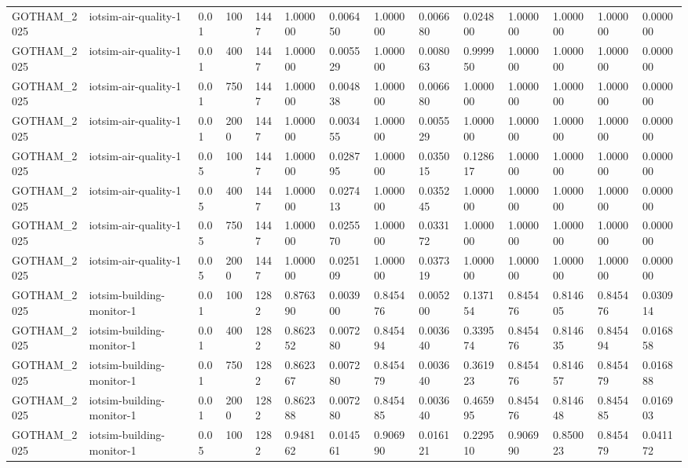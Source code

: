 \begin{tabular}{llllllllllllll}
GOTHAM\_2025 & iotsim-air-quality-1 & 0.01 & 100 & 1447 & 1.000000 & 0.006450 & 1.000000 & 0.006680 & 0.024800 & 1.000000 & 1.000000 & 1.000000 & 0.000000 \\
GOTHAM\_2025 & iotsim-air-quality-1 & 0.01 & 400 & 1447 & 1.000000 & 0.005529 & 1.000000 & 0.008063 & 0.999950 & 1.000000 & 1.000000 & 1.000000 & 0.000000 \\
GOTHAM\_2025 & iotsim-air-quality-1 & 0.01 & 750 & 1447 & 1.000000 & 0.004838 & 1.000000 & 0.006680 & 1.000000 & 1.000000 & 1.000000 & 1.000000 & 0.000000 \\
GOTHAM\_2025 & iotsim-air-quality-1 & 0.01 & 2000 & 1447 & 1.000000 & 0.003455 & 1.000000 & 0.005529 & 1.000000 & 1.000000 & 1.000000 & 1.000000 & 0.000000 \\
GOTHAM\_2025 & iotsim-air-quality-1 & 0.05 & 100 & 1447 & 1.000000 & 0.028795 & 1.000000 & 0.035015 & 0.128617 & 1.000000 & 1.000000 & 1.000000 & 0.000000 \\
GOTHAM\_2025 & iotsim-air-quality-1 & 0.05 & 400 & 1447 & 1.000000 & 0.027413 & 1.000000 & 0.035245 & 1.000000 & 1.000000 & 1.000000 & 1.000000 & 0.000000 \\
GOTHAM\_2025 & iotsim-air-quality-1 & 0.05 & 750 & 1447 & 1.000000 & 0.025570 & 1.000000 & 0.033172 & 1.000000 & 1.000000 & 1.000000 & 1.000000 & 0.000000 \\
GOTHAM\_2025 & iotsim-air-quality-1 & 0.05 & 2000 & 1447 & 1.000000 & 0.025109 & 1.000000 & 0.037319 & 1.000000 & 1.000000 & 1.000000 & 1.000000 & 0.000000 \\
GOTHAM\_2025 & iotsim-building-monitor-1 & 0.01 & 100 & 1282 & 0.876390 & 0.003900 & 0.845476 & 0.005200 & 0.137154 & 0.845476 & 0.814605 & 0.845476 & 0.030914 \\
GOTHAM\_2025 & iotsim-building-monitor-1 & 0.01 & 400 & 1282 & 0.862352 & 0.007280 & 0.845494 & 0.003640 & 0.339574 & 0.845476 & 0.814635 & 0.845494 & 0.016858 \\
GOTHAM\_2025 & iotsim-building-monitor-1 & 0.01 & 750 & 1282 & 0.862367 & 0.007280 & 0.845479 & 0.003640 & 0.361923 & 0.845476 & 0.814657 & 0.845479 & 0.016888 \\
GOTHAM\_2025 & iotsim-building-monitor-1 & 0.01 & 2000 & 1282 & 0.862388 & 0.007280 & 0.845485 & 0.003640 & 0.465995 & 0.845476 & 0.814648 & 0.845485 & 0.016903 \\
GOTHAM\_2025 & iotsim-building-monitor-1 & 0.05 & 100 & 1282 & 0.948162 & 0.014561 & 0.906990 & 0.016121 & 0.229510 & 0.906990 & 0.850023 & 0.845479 & 0.041172 \\

\end{tabular}
